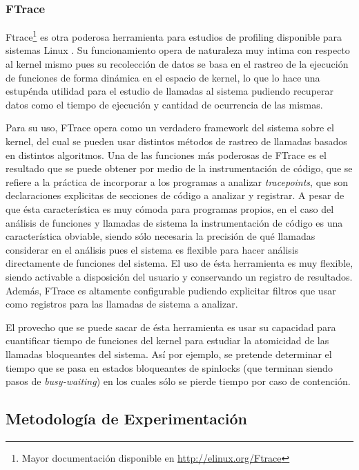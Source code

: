 \subsubsection{FTrace}
Ftrace\footnote{Mayor documentación disponible en \url{http://elinux.org/Ftrace}} es otra poderosa herramienta para estudios de profiling disponible para sistemas Linux \cite{paper:FTraceSony}. Su funcionamiento opera de naturaleza muy intima con respecto al kernel mismo pues su recolección de datos se basa en el rastreo de la ejecución de funciones de forma dinámica en el espacio de kernel, lo que lo hace una estupénda utilidad para el estudio de llamadas al sistema pudiendo recuperar datos como el tiempo de ejecución y cantidad de ocurrencia de las mismas.

Para su uso, FTrace opera como un verdadero framework del sistema sobre el kernel, del cual se pueden usar distintos métodos de rastreo de llamadas basados en distintos algoritmos. Una de las funciones más poderosas de FTrace es el resultado que se puede obtener por medio de la instrumentación de código, que se refiere a la práctica de incorporar a los programas a analizar \emph{tracepoints}, que son declaraciones explicitas de secciones de código a analizar y registrar. A pesar de que ésta característica es muy cómoda para programas propios, en el caso del análisis de funciones y llamadas de sistema la instrumentación de código es una característica obviable, siendo sólo necesaria la precisión de qué llamadas considerar en el análisis pues el sistema es flexible para hacer análisis directamente de funciones del sistema. El uso de ésta herramienta es muy flexible, siendo activable a disposición del usuario y conservando un registro de resultados. Además, FTrace es altamente configurable pudiendo explicitar filtros que usar como registros para las llamadas de sistema a analizar.

El provecho que se puede sacar de ésta herramienta es usar su capacidad para cuantificar tiempo de funciones del kernel para estudiar la atomicidad de las llamadas bloqueantes del sistema. Así por ejemplo, se pretende determinar el tiempo que se pasa en estados bloqueantes de spinlocks (que terminan siendo pasos de \emph{busy-waiting}) en los cuales sólo se pierde tiempo por caso de contención.

\subsection{Metodología de Experimentación}


